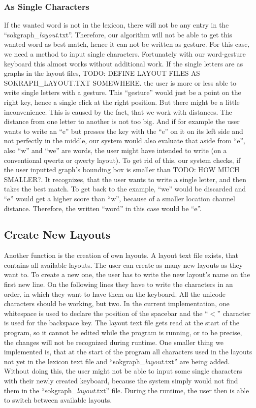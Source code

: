 \subsubsection{As Single Characters}
If the wanted word is not in the lexicon, there will not be any entry in the ``sokgraph\_\textit{layout}.txt''. Therefore, our algorithm will not be able to get this wanted word as best match, hence it can not be written as gesture. For this case, we need a method to input single characters. Fortunately with our word-gesture keyboard this almost works without additional work. If the single letters are as graphs in the layout files, TODO: DEFINE LAYOUT FILES AS SOKRAPH\_LAYOUT.TXT SOMEWHERE. the user is more or less able to write single letters with a gesture. This ``gesture'' would just be a point on the right key, hence a single click at the right position. But there might be a little inconvenience. This is caused by the fact, that we work with distances. The distance from one letter to another is not too big. And if for example the user wants to write an ``e'' but presses the key with the ``e'' on it on its left side and not perfectly in the middle, our system would also evaluate that aside from ``e'', also ``w'' and ``we'' are words, the user might have intended to write (on a conventional qwertz or qwerty layout). To get rid of this, our system checks, if the user inputted graph's bounding box is smaller than TODO: HOW MUCH SMALLER?. It recognizes, that the user wants to write a single letter, and then takes the best match. To get back to the example, ``we'' would be discarded and ``e'' would get a higher score than ``w'', because of a smaller location channel distance. Therefore, the written ``word'' in this case would be ``e''.

\subsection{Create New Layouts}
Another function is the creation of own layouts. A layout text file exists, that contains all available layouts. The user can create as many new layouts as they want to. To create a new one, the user has to write the new layout's name on the first new line. On the following lines they have to write the characters in an order, in which they want to have them on the keyboard. All the unicode characters should be working, but two. In the current implementation, one whitespace is used to declare the position of the spacebar and the ``$<$'' character is used for the backspace key. The layout text file gets read at the start of the program, so it cannot be edited while the program is running, or to be precise, the changes will not be recognized during runtime. One smaller thing we implemented is, that at the start of the program all characters used in the layouts not yet in the lexicon text file and ``sokgraph\_\textit{layout}.txt'' are being added. Without doing this, the user might not be able to input some single characters with their newly created keyboard, because the system simply would not find them in the ``sokgraph\_\textit{layout}.txt'' file. During the runtime, the user then is able to switch between available layouts.

